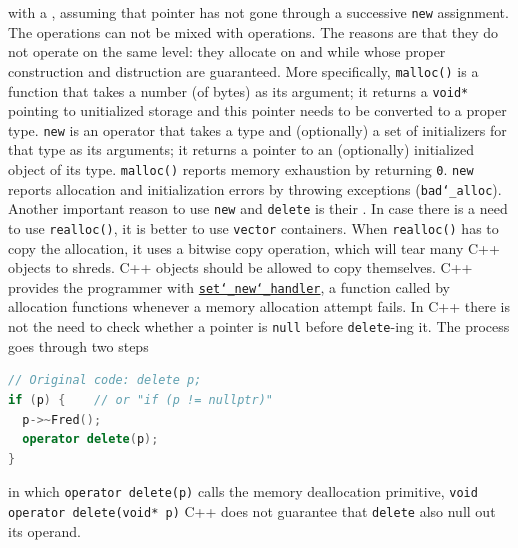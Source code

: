 with a , assuming that pointer has not gone through a 
successive \texttt{new} assignment.
\newline
The  operations can not be mixed with 
 operations. The reasons are that they do not 
operate on the same level: they allocate on  
and  while 
 whose proper 
construction and distruction are guaranteed. 
\newline
More specifically, \texttt{malloc()} is a function that takes a number 
(of bytes) as its argument; it returns a \texttt{void*} pointing to 
unitialized storage and this pointer needs to be converted to a proper 
type. \texttt{new} is an operator that takes a type and 
(optionally) a set of initializers for that type as its arguments; it 
returns a pointer to an (optionally) initialized object of its type.
\newline
\texttt{malloc()} reports memory exhaustion by returning \texttt{0}. 
\texttt{new} reports allocation and initialization errors by throwing 
exceptions (\texttt{bad\char`_alloc}).
\newline
Another important reason to use \texttt{new} and \texttt{delete} is their 
.
\newline
In case there is a need to use \texttt{realloc()}, it is better to use 
\texttt{vector} containers. When \texttt{realloc()} has to copy the 
allocation, it uses a bitwise copy operation, which will tear many C++ 
objects to shreds. C++ objects should be allowed to copy themselves. 
\newline
C++ provides the programmer with 
\href{https://en.cppreference.com/w/cpp/memory/new/set_new_handler}{\texttt{set\char`_new\char`_handler}}, 
a function called by allocation functions whenever a memory allocation 
attempt fails.
\newline
In C++ there is not the need to check whether a pointer is \texttt{null} 
before \texttt{delete}-ing it. The process goes through two steps
\begin{lstlisting}[language=C++]
// Original code: delete p;
if (p) {    // or "if (p != nullptr)"
  p->~Fred();
  operator delete(p);
}   
\end{lstlisting}
in which \texttt{operator delete(p)} calls the memory deallocation primitive, 
\texttt{void operator delete(void* p)}
C++ does not guarantee that \texttt{delete} also null out its operand. 
